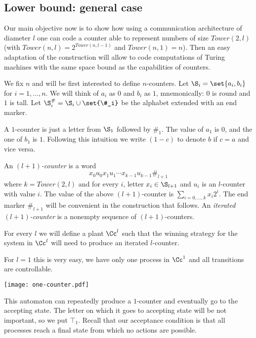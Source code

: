 \documentclass{llncs}
\newcommand{\Tower}{\mathit{Tower}}
\begin{document}
\subsection{Lower bound: general case}


Our main objective now is to show how using a communication
architecture of diameter $l$ one can code a counter able to represent numbers
of size $\Tower(2,l)$ (with $\Tower(n,l)=2^{\Tower(n,l-1)}$ and
$\Tower(n,1)=n$). Then an easy adaptation of the construction will allow
to code computations of Turing machines with the same space bound as
the capabilities of counters.

We fix $n$ and will be first interested to define $n$-counters.  Let
$\S_i=\set{a_i,b_i}$ for $i=1,\dots,n$. We will think of $a_i$ as $0$
and $b_i$ as $1$, mnemonically: $0$ is round and $1$ is tall. Let
$\S^\#_i=\S_i\cup\set{\#_i}$ be the alphabet extended with an end
marker.

A $1$-counter is just a letter from $\S_1$ followed by $\#_1$. The value
of $a_1$ is  $0$, and the one of $b_1$ is $1$. Following this
intuition we write $(1-c)$ to denote $b$ if $c=a$ and vice versa.

An \emph{$(l+1)$-counter} is a word
\begin{equation}\label{eq:ctr}
  x_0u_0  x_1u_1\cdots  x_{k-1} u_{k-1}\#_{l+1}
\end{equation}
where $k=\Tower(2,l)$ and for every $i$, letter $x_i\in\S_{l+1}$ and
$u_i$ is an $l$-counter with value $i$. The value of the above
$(l+1)$-counter is $\sum_{i=0,\dots,k} x_i2^i$.  The end marker
$\#_{l+1}$ will be convenient in the construction that follows.
An \emph{iterated $(l+1)$-counter} is a nonempty sequence of
$(l+1)$-counters.

\medskip For every $l$ we will define a plant $\Cc^l$ such that the winning
strategy for the system in $\Cc^l$ will need to produce an iterated
$l$-counter. 

\medskip For $l=1$ this is very easy, we have only one
process in $\Cc^1$ and all transitions are controllable. 

\noindent\centerline{\texttt{[image: one-counter.pdf]}}

This automaton can repeatedly produce a $1$-counter and eventually go
to the accepting state. The letter on which it goes to accepting state
will be not important, so we put $\top_1$. Recall that our acceptance
condition is that all processes reach a final state from which no
actions are possible.
\end{document}
